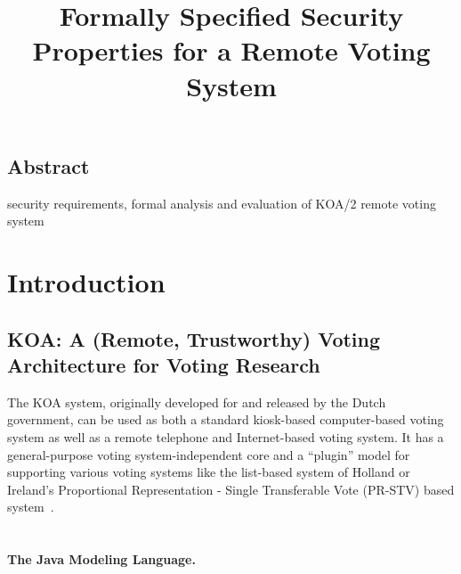 \documentclass{llncs}
\begin{document}
\date{}

\title{\Large \bf Formally Specified Security Properties for a Remote
Voting System}

\maketitle

\thispagestyle{empty}

\subsection*{Abstract}
security requirements, formal analysis and evaluation of KOA/2 remote voting
system


\section{Introduction}

 
\subsection{KOA: A (Remote, Trustworthy) Voting Architecture for Voting Research}

The KOA system, originally developed for and released by the Dutch government, 
can be used as both a standard
kiosk-based computer-based voting system as well as a remote telephone and
Internet-based voting system.  It has a general-purpose voting
system-independent core and a ``plugin'' model for supporting various
voting systems like the list-based system of Holland or Ireland's
Proportional Representation - Single Transferable Vote (PR-STV) based
system~\cite{KiniryEtAl06}.

\section{}

\subsection{}

\paragraph{The Java Modeling Language.}
\end{document}
